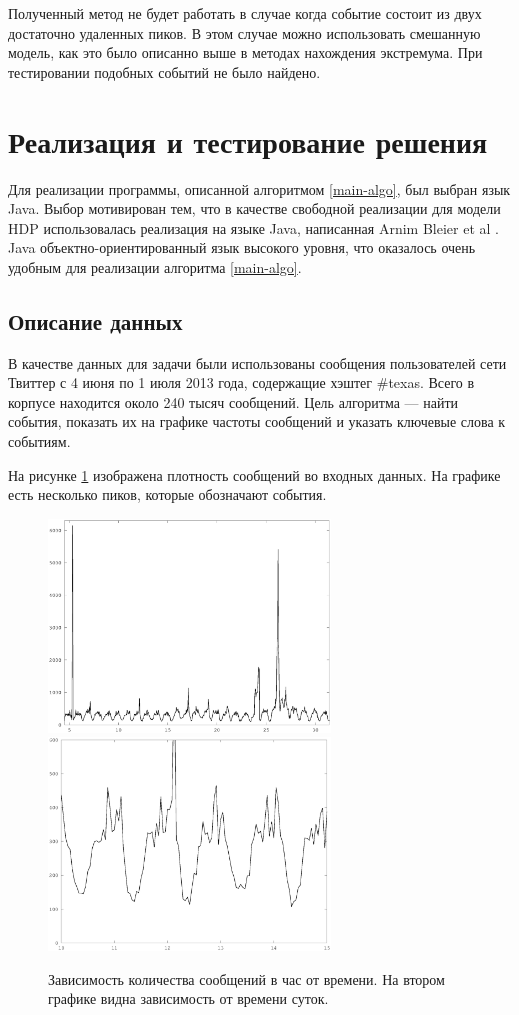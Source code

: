 \documentclass[12pt, a4paper]{article}
\begin{document}
  Полученный метод не будет работать в случае когда событие состоит из двух достаточно удаленных пиков. В этом случае можно использовать смешанную модель, как это было описанно выше в методах нахождения экстремума. При тестировании подобных событий не было найдено.
  

  \section{Реализация и тестирование решения}
  Для реализации программы, описанной алгоритмом \ref{main-algo}, был выбран язык Java. Выбор мотивирован тем, что в качестве свободной реализации для модели HDP использовалась реализация на языке Java, написанная Arnim Bleier et al \cite{hdp-2}. Java объектно-ориентированный язык высокого уровня, что оказалось очень удобным для реализации  алгоритма \ref{main-algo}.
  
  \subsection{Описание данных}
  В качестве данных для задачи были использованы сообщения пользователей сети Твиттер с 4 июня по 1 июля 2013 года, содержащие хэштег \#texas. Всего в корпусе находится около 240 тысяч сообщений. Цель алгоритма --- найти события, показать их на графике частоты сообщений и указать ключевые слова к событиям.
  
  На рисунке \ref{fig:all-freq} изображена плотность сообщений во входных данных. На графике есть несколько пиков, которые обозначают события. 
  \begin{figure}[H]
  \centering
  \label{fig:all-freq}
  \includegraphics[width=7.5cm]{all-freq.eps}
  \includegraphics[width=7.5cm]{all-freq-scaled.eps}
  \caption{Зависимость количества сообщений в час от времени. На втором графике видна зависимость от времени суток.}
  \end{figure}
  
\end{document}
